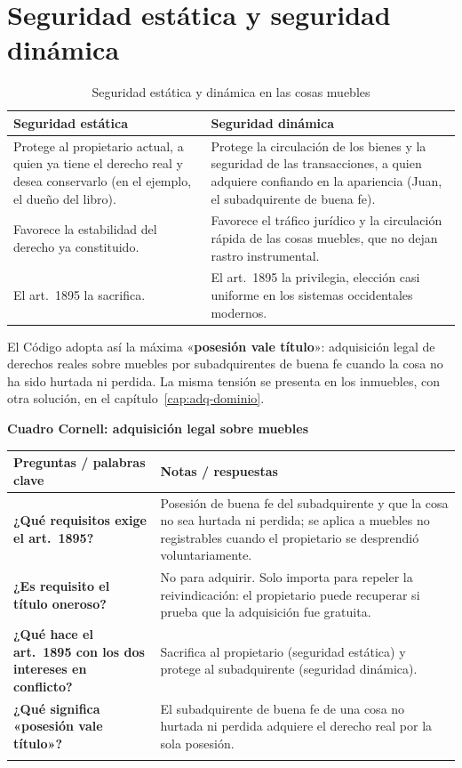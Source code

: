 \documentclass[12pt,oneside]{book}
\renewcommand{\arraystretch}{1.25}
\newcommand{\cq}[2]{\textbf{#1} & #2 \\[0.45em]}
\newcommand{\cornell}[3]{%
\par\bigskip\noindent\textbf{\large Cuadro Cornell: #1}\par\smallskip
\begin{center}
\small
\renewcommand{\arraystretch}{1.15}
\begin{tabularx}{\textwidth}{>{\raggedright\arraybackslash}p{0.27\textwidth}>{\raggedright\arraybackslash}X}
\toprule
\textbf{Preguntas / palabras clave} & \textbf{Notas / respuestas} \\
\midrule
#2
\midrule
\multicolumn{2}{p{\dimexpr\textwidth-2\tabcolsep\relax}}{\textbf{Resumen.} #3} \\
\bottomrule
\end{tabularx}
\end{center}
}
\begin{document}
\section{Seguridad estática y seguridad dinámica}

\begin{table}[H]
\centering
\small
\begin{tabularx}{\textwidth}{>{\raggedright\arraybackslash}X>{\raggedright\arraybackslash}X}
\toprule
\textbf{Seguridad estática} & \textbf{Seguridad dinámica} \\
\midrule
Protege al propietario actual, a quien ya tiene el derecho real y desea conservarlo (en el ejemplo, el dueño del libro). & Protege la circulación de los bienes y la seguridad de las transacciones, a quien adquiere confiando en la apariencia (Juan, el subadquirente de buena fe). \\
Favorece la estabilidad del derecho ya constituido. & Favorece el tráfico jurídico y la circulación rápida de las cosas muebles, que no dejan rastro instrumental. \\
El art.~1895 la sacrifica. & El art.~1895 la privilegia, elección casi uniforme en los sistemas occidentales modernos. \\
\bottomrule
\end{tabularx}
\caption{Seguridad estática y dinámica en las cosas muebles}
\end{table}

El Código adopta así la máxima «\textbf{posesión vale título}»: adquisición legal de derechos reales sobre muebles por subadquirentes de buena fe cuando la cosa no ha sido hurtada ni perdida. La misma tensión se presenta en los inmuebles, con otra solución, en el capítulo~\ref{cap:adq-dominio}.

\cornell{adquisición legal sobre muebles}{
\cq{¿Qué requisitos exige el art.~1895?}{Posesión de buena fe del subadquirente y que la cosa no sea hurtada ni perdida; se aplica a muebles no registrables cuando el propietario se desprendió voluntariamente.}
\cq{¿Es requisito el título oneroso?}{No para adquirir. Solo importa para repeler la reivindicación: el propietario puede recuperar si prueba que la adquisición fue gratuita.}
\cq{¿Qué hace el art.~1895 con los dos intereses en conflicto?}{Sacrifica al propietario (seguridad estática) y protege al subadquirente (seguridad dinámica).}
\cq{¿Qué significa «posesión vale título»?}{El subadquirente de buena fe de una cosa no hurtada ni perdida adquiere el derecho real por la sola posesión.}
}{El art.~1895 privilegia la seguridad de las transacciones: el subadquirente de buena fe de una cosa mueble no registrable, no hurtada ni perdida, adquiere el derecho real principal, salvo que el propietario pruebe que adquirió gratuitamente.}
\end{document}
